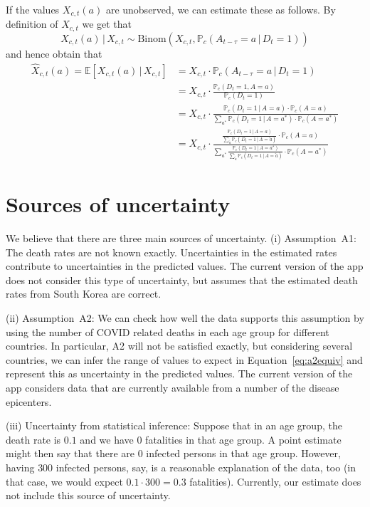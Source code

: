 \documentclass[a4paper]{article}
\renewcommand\P{\mathbb{P}}
\newcommand\E{\mathbb{E}}
\newcommand{\given}{\, \vert \,}
\newcommand\Niklas[1]{{\color{Fuchsia}Niklas: #1}}
\begin{document}
%
If the values $X_{c,t}(a)$ are unobserved, we can estimate these as follows. By definition of $X_{c,t}$ we get that
$$X_{c,t}(a) \given X_{c,t} \sim \text{Binom}(X_{c,t}, \P_c(A_{t-\tau} = a \given D_{t} = 1))$$
and hence obtain that
\begin{align*}
\hat{X}_{c,t}(a) = \E[X_{c,t}(a) \given X_{c,t}] 	
&= X_{c,t} \cdot \P_c(A_{t-\tau} = a \given D_{t} = 1) \\
     &= 
X_{c,t} \cdot 
\frac{  
    \P_c(D_t = 1, A = a)}
  {\P_c(D_t = 1)}\\
    &= 
X_{c,t} \cdot 
\frac{  
    \P_c(D_t = 1\given A = a)
     \cdot \P_c(A = a)}
  {\sum_{a^*}  
    \P_c(D_t = 1\given A = a^*) \cdot \P_c(A = a^*)
    }\\
&= 
X_{c,t} \cdot 
\frac{
  \frac{
    \P_c(D_t = 1\given A = a)}
    {\sum_{\tilde{a}} \P_c(D_t = 1 \given A = \tilde{a})} \cdot \P_c(A = a)}
  {\sum_{a^*}  
  \frac{
    \P_c(D_t = 1\given A = a^*)}
    {\sum_{\tilde{a}} \P_c(D_t = 1 \given A = \tilde{a})} \cdot \P_c(A = a^*)}
\end{align*}



\section{Sources of uncertainty} \label{sec:uncert}
We believe that there are 
three main sources of uncertainty. 
(i) Assumption~A1: 
The death rates are not known exactly. Uncertainties in the 
estimated rates
contribute to uncertainties in the
predicted values.
The current version of the app does not consider
this type of uncertainty, but assumes 
that the estimated death rates from South Korea are correct.

(ii) Assumption~A2: We can check 
how well the data supports 
this assumption by using 
the number of COVID related deaths in each age group for different countries. 
In particular, A2 will not be satisfied exactly, but 
considering several countries, we can 
infer the range of values to expect in Equation~\eqref{eq:a2equiv}
and represent this as uncertainty in the predicted values. 
The current version of the app considers data that are currently available from a number of the disease epicenters.

(iii) Uncertainty from statistical inference: 
Suppose that in an age group, the death rate is $0.1$ and we have 
$0$ fatalities in that age group.
A point estimate might then say that there are $0$ infected persons
in that age group. However, having $300$ infected persons, say,
is a reasonable explanation of the data, too (in that case, we would expect $0.1\cdot 300 = 0.3$ fatalities).
Currently, our estimate does not include this source of uncertainty.
\end{document}
